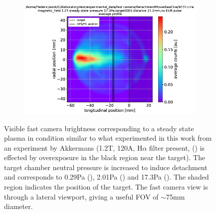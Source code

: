 \begin{figure}[!ht]
\begin{subfigure}{0.31\textwidth}
     \end{subfigure}
     \hfill
     \begin{subfigure}{0.31\textwidth}
         \centering
         \vspace*{-0mm}
         \includegraphics[width=\textwidth,trim={39 0 17 11},clip]{Chapters/chapter3/figs/fast_camera_9337.cine.png}
         \vspace*{-17mm}
         {\color{white}\caption{\phantom{wewwwww}}\label{fig:SSc}}
     \end{subfigure}
        \vspace*{+6mm}
        \caption{Visible fast camera brightness corresponding to a steady state plasma in condition similar to what experimented in this work from an experiment by Akkermans\cite{Akkermans2020} (1.2T, 120A, H$\alpha$ filter present, () is effected by overexposure in the black region near the target). The target chamber neutral pressure is increased to induce detachment and corresponds to 0.29Pa (), 2.01Pa () and 17.3Pa (). The shaded region indicates the position of the target. The fast camera view is through a lateral viewport, giving a useful FOV of $\sim$75mm diameter.}
        \label{fig:SS}
\end{figure}

